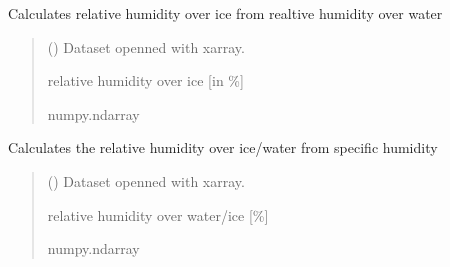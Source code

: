 \documentclass[a4paper,11pt,english]{sphinxmanual}
\begin{document}
\begin{fulllineitems}
\label{\detokenize{modules:climaccf.calc_altrv_vars.get_rh_ice}}
\pysigstartsignatures
{}
\pysigstopsignatures
\sphinxAtStartPar
Calculates relative humidity over ice from realtive humidity over water
\begin{quote}\begin{description}
\sphinxAtStartPar
{} () \textendash{} Dataset openned with xarray.

\sphinxAtStartPar
relative humidity over ice {[}in \%{]}

\sphinxAtStartPar
numpy.ndarray

\end{description}\end{quote}

\end{fulllineitems}


\begin{fulllineitems}
\label{\detokenize{modules:climaccf.calc_altrv_vars.get_rh_sd}}
\pysigstartsignatures
{}
\pysigstopsignatures
\sphinxAtStartPar
Calculates the relative humidity over ice/water from specific humidity
\begin{quote}\begin{description}
\sphinxAtStartPar
{} () \textendash{} Dataset openned with xarray.

\sphinxAtStartPar
relative humidity over water/ice {[}\%{]}

\sphinxAtStartPar
numpy.ndarray

\end{description}\end{quote}

\end{fulllineitems}
\end{document}
